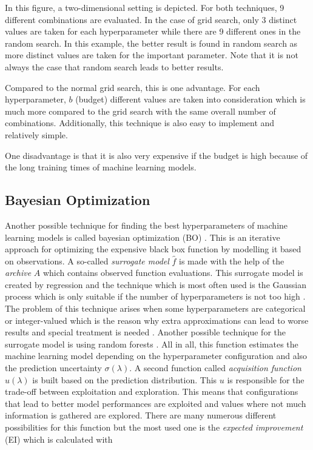 In this figure, a two-dimensional setting is depicted. For both techniques, 9 different combinations are evaluated. In the case of grid search, only 3 distinct values are taken for each hyperparameter while there are 9 different ones in the random search. In this example, the better result is found in random search as more distinct values are taken for the important parameter. Note that it is not always the case that random search leads to better results.

Compared to the normal grid search, this is one advantage. For each hyperparameter, $ b $ (budget) different values are taken into consideration which is much more compared to the grid search with the same overall number of combinations. Additionally, this technique is also easy to implement and relatively simple. 

One disadvantage is that it is also very expensive if the budget is high because of the long training times of machine learning models. 


\subsection{Bayesian Optimization}

Another possible technique for finding the best hyperparameters of machine learning models is called bayesian optimization (BO) \cite{snoek2012practical}. This is an iterative approach for optimizing the expensive black box function by modelling it based on observations. A so-called \textit{surrogate model} $ \hat{f} $ is made with the help of the \textit{archive} $ A $ which contains observed function evaluations. This surrogate model is created by regression and the technique which is most often used is the Gaussian process \cite{bischl2021hyperparameter} which is only suitable if the number of hyperparameters is not too high \cite{andonie2019hyperparameter}. The problem of this technique arises when some hyperparameters are categorical or integer-valued which is the reason why extra approximations can lead to worse results and special treatment is needed \cite{garrido2020dealing}. Another possible technique for the surrogate model is using random forests \cite{hutter2011sequential}. All in all, this function estimates the machine learning model depending on the hyperparameter configuration and also the prediction uncertainty $ \sigma(\lambda) $. A second function called \textit{acquisition function} $ u(\lambda)$ is built based on the prediction distribution. This $ u $ is responsible for the trade-off between exploitation and exploration. This means that configurations that lead to better model performances are exploited and values where not much information is gathered are explored. There are many numerous different possibilities for this function  \cite{wilson2018maximizing} but the most used one is the \textit{expected improvement} (EI) which is calculated with

